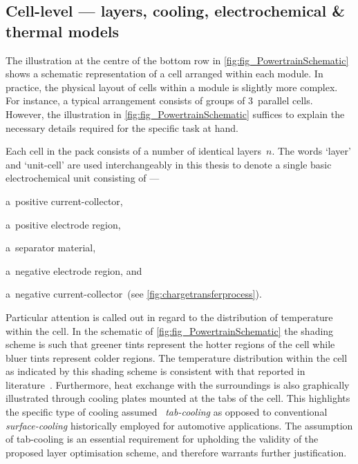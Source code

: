 
\subsection{Cell-level --- layers, cooling, electrochemical \& thermal models}\label{sec:celllevelxeVinfo}

The    illustration    at     the    centre    of    the     bottom    row    in
\cref{fig:fig_PowertrainSchematic} shows  a schematic  representation of  a cell
arranged within  each module. In practice,  the physical layout of  cells within
a  module  is  slightly  more  complex.  For  instance,  a  typical  arrangement
consists  of  groups   of  3~parallel  cells.  However,   the  illustration  in
\cref{fig:fig_PowertrainSchematic}  suffices to  explain  the necessary  details
required for the specific task at hand.

Each cell in the pack consists of a number of identical layers~$n$. The words
`layer' and `unit-cell' are used interchangeably in this thesis to denote a
single basic electrochemical unit consisting of ---
\begin{enumerate*}[label=\roman*)]
    \item a~positive current-collector,
    \item a~positive electrode region,
    \item a~separator material,
    \item a~negative electrode region, and
    \item a~negative current-collector~(see \cref{fig:chargetransferprocess}).
\end{enumerate*}
Particular attention is called out in  regard to the distribution of temperature
within  the cell.  In  the schematic  of \cref{fig:fig_PowertrainSchematic}  the
shading scheme  is such that greener  tints represent the hotter  regions of the
cell while bluer tints represent colder regions. The temperature distribution
within the cell as indicated by this shading scheme is consistent with that
reported in literature~\cite{Veth2014,Bazinski2014,Zhao2018}. Furthermore, heat
exchange with the surroundings is also graphically  illustrated through cooling
plates mounted at the tabs  of the cell. This  highlights the specific type  of
cooling assumed \viz~\emph{tab-cooling}  as  opposed to  conventional 
\emph{surface-cooling} historically employed for automotive applications. The
assumption of tab-cooling is an  essential requirement for  upholding the 
validity of the  proposed layer optimisation scheme, and therefore warrants
further justification.

